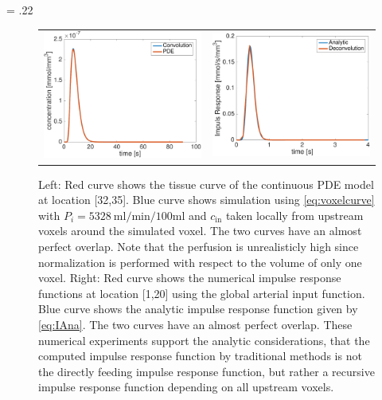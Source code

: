 \documentclass[journal,twocolumn]{IEEEtran}
\newcommand{\siPml}{\milli\litre\per\minute\per100\milli\litre}
\newlength{\fwd}
\begin{document}
	\fwd = .22\textwidth
	\begin{figure}
		\begin{tabular}{p{\fwd} p{\fwd}}
			\includegraphics[width=\fwd]{./figs/ConvVsPDE.pdf} & \includegraphics[width=\fwd]{./figs/IDecVsIAna.pdf} \\
		\end{tabular}
		\caption{Left: Red curve shows the tissue curve of the continuous PDE model at location [32,35]. Blue curve shows simulation using \eqref{eq:voxelcurve} with $P_i=\SI{5328}{\siPml}$ and $c_{\mathrm{in}}$ taken locally from upstream voxels around the simulated voxel. The two curves have an almost perfect overlap. Note that the perfusion is unrealisticly high since normalization is performed with respect to the volume of only one voxel. Right: Red curve shows the numerical impulse response functions at location [1,20] using the global arterial input function. Blue curve shows the analytic impulse response function given by \eqref{eq:IAna}. The two curves have an almost perfect overlap. These numerical experiments support the analytic considerations, that the computed impulse response function by traditional methods is not the directly feeding impulse response function, but rather a recursive impulse response function depending on all upstream voxels. }\label{fig:VoxelComp}
	\end{figure}
\end{document}
